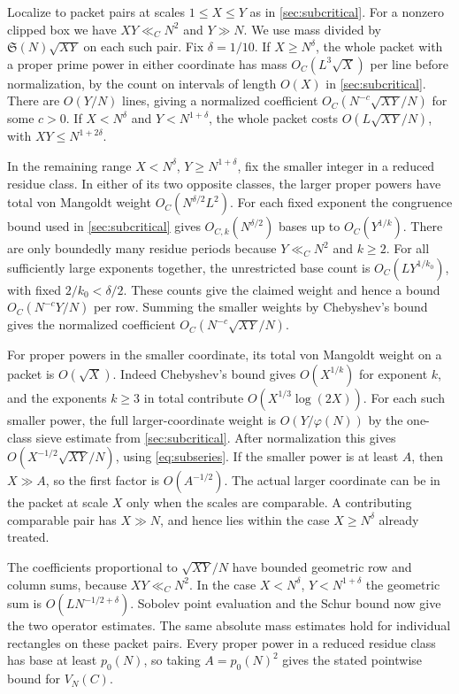 \documentclass[11pt,a4paper]{article}
\numberwithin{equation}{section}
\newcommand{\SSS}{\mathfrak S}
\begin{document}
Localize to packet pairs at scales $1\le X\le Y$ as in
\cref{sec:subcritical}. For a nonzero clipped box we
have $XY\ll_C N^2$ and $Y\gg N$. We use mass divided
by $\SSS(N)\sqrt{XY}$ on each such pair.
Fix $\delta=1/10$. If $X\ge N^\delta$, the whole packet
with a proper prime power in either coordinate has
mass $O_C(L^3\sqrt X)$ per line before normalization,
by the count on intervals of length $O(X)$ in
\cref{sec:subcritical}. There are $O(Y/N)$ lines, giving
a normalized coefficient
$O_C(N^{-c}\sqrt{XY}/N)$ for some $c>0$.
If $X<N^\delta$ and $Y<N^{1+\delta}$, the whole packet
costs $O(L\sqrt{XY}/N)$, with $XY\le N^{1+2\delta}$.

In the remaining range $X<N^\delta$, $Y\ge N^{1+\delta}$,
fix the smaller integer in a reduced residue class.
In either of its two opposite classes, the larger
proper powers have total von Mangoldt weight
$O_C(N^{\delta/2}L^2)$. For each fixed exponent the
congruence bound used in \cref{sec:subcritical} gives
$O_{C,k}(N^{\delta/2})$ bases up to $O_C(Y^{1/k})$.
There are only boundedly many residue periods because
$Y\ll_C N^2$ and $k\ge2$. For all sufficiently large
exponents together, the unrestricted base count is
$O_C(L Y^{1/k_0})$, with fixed $2/k_0<\delta/2$.
These counts give the claimed weight and hence a bound
$O_C(N^{-c}Y/N)$ per row. Summing the smaller weights
by Chebyshev's bound gives the normalized coefficient
$O_C(N^{-c}\sqrt{XY}/N)$.

For proper powers in the smaller coordinate, its total
von Mangoldt weight on a packet is $O(\sqrt X)$.
Indeed Chebyshev's bound gives $O(X^{1/k})$ for exponent
$k$, and the exponents $k\ge3$ in total contribute
$O(X^{1/3}\log(2X))$. For each such smaller power, the
full larger-coordinate weight is $O(Y/\varphi(N))$ by
the one-class sieve estimate from \cref{sec:subcritical}.
After normalization this gives
$O(X^{-1/2}\sqrt{XY}/N)$, using \cref{eq:subseries}.
If the smaller power is at least $A$, then $X\gg A$,
so the first factor is $O(A^{-1/2})$.
The actual larger coordinate can be in the packet at
scale $X$ only when the scales are comparable. A
contributing comparable pair has $X\gg N$, and hence
lies within the case $X\ge N^\delta$ already treated.

The coefficients proportional to $\sqrt{XY}/N$ have
bounded geometric row and column sums, because
$XY\ll_C N^2$. In the case $X<N^\delta$,
$Y<N^{1+\delta}$ the geometric sum is
$O(LN^{-1/2+\delta})$. Sobolev point evaluation and the
Schur bound now give the two operator estimates. The
same absolute mass estimates hold for individual
rectangles on these packet pairs.
Every proper power in a reduced residue class has
base at least $p_0(N)$, so taking $A=p_0(N)^2$ gives
the stated pointwise bound for $V_N(C)$.
\end{document}
